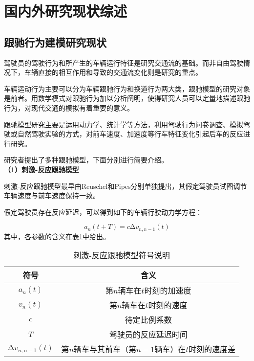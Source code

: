 \section{国内外研究现状综述}

\subsection{跟驰行为建模研究现状}

驾驶员的驾驶行为和所产生的车辆运行特征是研究交通流的基础。而非自由驾驶情况下，车辆直接的相互作用和导致的交通流变化则是研究的重点。

车辆运动行为主要可以分为车辆跟驰行为和换道行为两大类，跟驰模型的研究对象是前者。用数学模式对跟驰行为加以分析阐明，使得研究人员可以定量地描述跟驰行为，对现代交通的模拟有着重要的意义。

跟驰模型研究主要是运用动力学、统计学等方法，利用驾驶行为问卷调查、模拟驾驶或自然驾驶实验的方式，对前车速度、加速度等行车特征变化引起后车的反应进行研究。

研究者提出了多种跟驰模型，下面分别进行简要介绍。 \\

\noindent \textbf{（1）刺激-反应跟驰模型}

刺激-反应跟驰模型最早由Reuschel\cite{reuschel1950vehicle}和Pipes\cite{Pipes}分别单独提出，其假定驾驶员试图调节车辆速度与前车速度保持一致。

假定驾驶员存在反应延迟，可以得到如下的车辆行驶动力学方程：

\begin{equation}
  a_n(t+T) = c\increment{v_{n, n-1}}(t)
  \label{eq:chap01-1}
\end{equation}
其中，各参数的含义在表\ref{tab:chap01-1}中给出。

\begin{table}
  \centering
  \caption{刺激-反应跟驰模型符号说明}
  \begin{tabular}{cc}
    \toprule
    符号          &  含义                         \\
    \midrule
    $a_n(t)$   & 第$n$辆车在$t$时刻的加速度         \\
    $v_n(t)$   & 第$n$辆车在$t$时刻的速度         \\
    $c$        & 待定比例系数                    \\
    $T$        & 驾驶员的反应延迟时间 \\
    $\increment{v_{n, n-1}}(t)$  &  第$n$辆车与其前车（第$n-1$辆车）在$t$时刻的速度差   \\
    \bottomrule
  \end{tabular}
  \label{tab:chap01-1}
\end{table}

